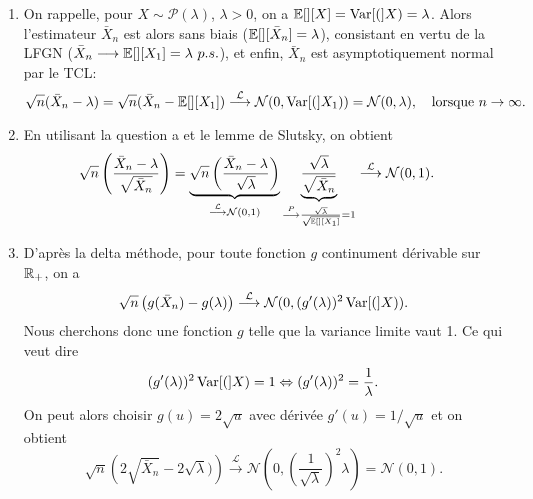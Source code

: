 \begin{solution}
  \begin{enumerate}
    \item On rappelle, pour $X\sim\mathcal P(\lambda)$, $\lambda>0$, on a
          $\mathbb{E}[][X]=\operatorname{Var}[(]X)=\lambda$. Alors l'estimateur $\bar X_n$ est alors sans
          biais ($\mathbb{E}[][\bar X_n] =\lambda$), consistant en vertu de la LFGN
          ($\bar X_n\longrightarrow \mathbb{E}[][X_1]=\lambda~p.s.$), et enfin,
          $\bar{X}_n$ est asymptotiquement normal par le TCL: $$\sqrt n( \bar{X}
            _n-\lambda)=\sqrt n( \bar X_n-\mathbb{E}[][X_1])\stackrel{\mathcal
              L}\longrightarrow\mathcal N(0,\operatorname{Var}[(]X_1))=\mathcal
            N(0,\lambda),\quad\text{lorsque }n\to\infty.$$
    \item En utilisant la question a et le lemme de Slutsky, on obtient
          \begin{align*}
            \sqrt n \left(\frac{\bar X_n-\lambda}{\sqrt{\bar X_n}} \right)
             & = \underbrace{ \sqrt n \left(\frac{\bar X_n-\lambda}{\sqrt{\lambda}} \right) }_{\stackrel{\mathcal L}\longrightarrow\mathcal N(0,1)} \underbrace{\frac{\sqrt{\lambda}}{\sqrt{\bar X_n}}}_{\stackrel{P}\longrightarrow \frac{\sqrt{\lambda}}{\sqrt{\mathbb{E}[][X_1]}}=1}
            \stackrel{\mathcal L}\longrightarrow\mathcal N(0,1).
          \end{align*}
    \item D'apr\`es la delta m\'ethode, pour toute fonction $g$ continument d\'erivable
          sur $\mathbb{R}_+$, on a $$\sqrt n \left(g(\bar X_n)-g(\lambda)
            \right)\stackrel{\mathcal L}\longrightarrow\mathcal
            N(0,(g'(\lambda))^2\operatorname{Var}[(]X)).$$ Nous cherchons donc une fonction $g$ telle que
          la variance limite vaut 1. Ce qui veut dire $$(g'(\lambda))^2\operatorname{Var}[(]X)=1
            \Leftrightarrow (g'(\lambda))^2 = \frac1\lambda. $$ On peut alors choisir $g(u)
            = 2\sqrt u$ avec d\'eriv\'ee $g'(u)= 1/\sqrt u$ et on obtient $$\sqrt n
            \left(2\sqrt{\bar X_n}-2\sqrt \lambda) \right)\stackrel{\mathcal
              L}\longrightarrow\mathcal
            N\left(0,\left(\frac1{\sqrt\lambda}\right)^2\lambda\right)=\mathcal N(0,1).$$
  \end{enumerate}

\end{solution}

